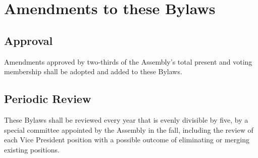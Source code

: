 \chapter{Amendments to these Bylaws}

\section{Approval}
Amendments approved by two-thirds of the Assembly’s total present and voting membership shall be adopted and added to these Bylaws.

\section{Periodic Review}
These Bylaws shall be reviewed every year that is evenly divisible by five, by a special committee appointed by the Assembly in the fall, including the review of each Vice President position with a possible outcome of eliminating or merging existing positions.
